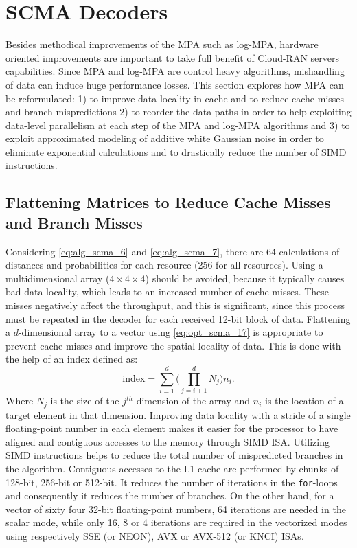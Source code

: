 \section{SCMA Decoders}
\label{sec:opt_scma}

Besides methodical improvements of the MPA such as log-MPA, hardware oriented
improvements are important to take full benefit of Cloud-RAN servers
capabilities. Since MPA and log-MPA are control heavy algorithms, mishandling of
data can induce huge performance losses. This section explores how MPA can be
reformulated: 1) to improve data locality in cache and to reduce cache misses
and branch mispredictions 2) to reorder the data paths in order to help
exploiting data-level parallelism at each step of the MPA and log-MPA algorithms
and 3) to exploit approximated modeling of additive white Gaussian noise in
order to eliminate exponential calculations and to drastically reduce the number
of SIMD instructions.

\subsection{Flattening Matrices to Reduce Cache Misses and Branch Misses}
\label{sec:opt_scma_flattening}

Considering \eqref{eq:alg_scma_6} and \eqref{eq:alg_scma_7}, there are 64
calculations of distances and probabilities for each resource (256 for all
resources). Using a multidimensional array ($4\times4\times4$) should be
avoided, because it typically causes bad data locality, which leads to an
increased number of cache misses. These misses negatively affect the throughput,
and this is significant, since this process must be repeated in the decoder for
each received 12-bit block of data. Flattening a $d$-dimensional array to a
vector using \eqref{eq:opt_scma_17} is appropriate to prevent cache misses and
improve the spatial locality of data. This is done with the help of an index
defined as:
\begin{equation}
  \label{eq:opt_scma_17}
  \text{index} = \sum\limits_{i=1}^d\Bigg( \prod\limits_{j=i+1}^d N_j \Bigg)n_i.
\end{equation}
Where $N_j$ is the size of the $j^{th}$ dimension of the array and $n_i$ is the
location of a target element in that dimension. Improving data locality with
a stride of a single floating-point number in each element makes it easier for
the processor to have aligned and contiguous accesses to the memory through SIMD
ISA. Utilizing SIMD instructions helps to reduce the total number of
mispredicted branches in the algorithm. Contiguous accesses to the L1 cache are
performed by chunks of 128-bit, 256-bit or 512-bit. It reduces the number of
iterations in the \verb|for|-loops and consequently it reduces the number of
branches. On the other hand, for a vector of sixty four 32-bit floating-point
numbers, 64 iterations are needed in the scalar mode, while only 16, 8 or 4
iterations are required in the vectorized modes using respectively SSE (or
NEON), AVX or AVX-512 (or KNCI) ISAs.

